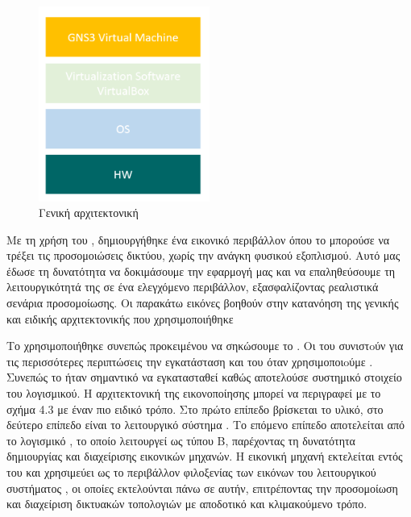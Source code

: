 \begin{figure}[htb]
	\centering
	\includegraphics[width=0.5\textwidth]{graphics/Architecture_virtualbox.PNG}
	\caption{ Γενική αρχιτεκτονική}
\end{figure}

Με τη χρήση του , δημιουργήθηκε ένα εικονικό περιβάλλον όπου το  μπορούσε να τρέξει τις προσομοιώσεις δικτύου, χωρίς την ανάγκη φυσικού εξοπλισμού. Αυτό μας έδωσε τη δυνατότητα να δοκιμάσουμε την εφαρμογή μας και να επαληθεύσουμε τη λειτουργικότητά της σε ένα ελεγχόμενο περιβάλλον, εξασφαλίζοντας ρεαλιστικά σενάρια προσομοίωσης.
Οι παρακάτω εικόνες βοηθούν στην κατανόηση της γενικής και ειδικής αρχιτεκτονικής που χρησιμοποιήθηκε



\FloatBarrier

Το  χρησιμοποιήθηκε συνεπώς προκειμένου να σηκώσουμε το . Οι  του  συνιστoύν για τις περισσότερες περιπτώσεις την εγκατάσταση και του  όταν χρησιμοποιoύμε . Συνεπώς το  ήταν σημαντικό να εγκατασταθεί καθώς αποτελούσε συστημικό στοιχείο του  λογισμικού. Η αρχιτεκτονική της εικονοποίησης μπορεί να περιγραφεί με το σχήμα 4.3 με έναν πιο ειδικό τρόπο. Στο πρώτο επίπεδο βρίσκεται το υλικό, στο δεύτερο επίπεδο είναι το λειτουργικό σύστημα . Το επόμενο επίπεδο αποτελείται από το λογισμικό , το οποίο λειτουργεί ως  τύπου Β, παρέχοντας τη δυνατότητα δημιουργίας και διαχείρισης εικονικών μηχανών. Η εικονική μηχανή  εκτελείται εντός του  και χρησιμεύει ως το περιβάλλον φιλοξενίας των εικόνων του λειτουργικού συστήματος , οι οποίες εκτελούνται πάνω σε αυτήν, επιτρέποντας την προσομοίωση και διαχείριση δικτυακών τοπολογιών με αποδοτικό και κλιμακούμενο τρόπο.



